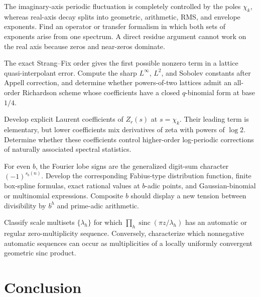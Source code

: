 \documentclass[11pt]{article}
\numberwithin{equation}{section}
\theoremstyle{definition}
\theoremstyle{remark}
\newcommand{\sinc}{\operatorname{sinc}}
\begin{document}
\begin{problem}
The imaginary-axis periodic fluctuation is completely controlled by the poles
$\chi_k$, whereas real-axis decay splits into geometric, arithmetic, RMS, and
envelope exponents.  Find an operator or transfer formalism in which both sets of
exponents arise from one spectrum.  A direct residue argument cannot work on the
real axis because zeros and near-zeros dominate.
\end{problem}

\begin{problem}
The exact Strang--Fix order gives the first possible nonzero term in a lattice
quasi-interpolant error.  Compute the sharp $L^\infty$, $L^2$, and Sobolev
constants after Appell correction, and determine whether powers-of-two lattices
admit an all-order Richardson scheme whose coefficients have a closed
$q$-binomial form at base $1/4$.
\end{problem}

\begin{problem}
Develop explicit Laurent coefficients of $Z_r(s)$ at $s=\chi_k$.  Their leading
term is elementary, but lower coefficients mix derivatives of zeta with powers
of $\log2$.  Determine whether these coefficients control higher-order
log-periodic corrections of naturally associated spectral statistics.
\end{problem}

\begin{problem}
For even $b$, the Fourier lobe signs are the generalized digit-sum character
$(-1)^{s_b(n)}$.  Develop the corresponding Fabius-type distribution function,
finite box-spline formulas, exact rational values at $b$-adic points, and
Gaussian-binomial or multinomial expressions.  Composite $b$ should display a
new tension between divisibility by $b^h$ and prime-adic arithmetic.
\end{problem}

\begin{problem}
Classify scale multisets $\{\lambda_h\}$ for which
$\prod_h\sinc(\pi z/\lambda_h)$ has an automatic or regular zero-multiplicity
sequence.  Conversely, characterize which nonnegative automatic sequences can
occur as multiplicities of a locally uniformly convergent geometric sinc
product.
\end{problem}

\section{Conclusion}
\end{document}
